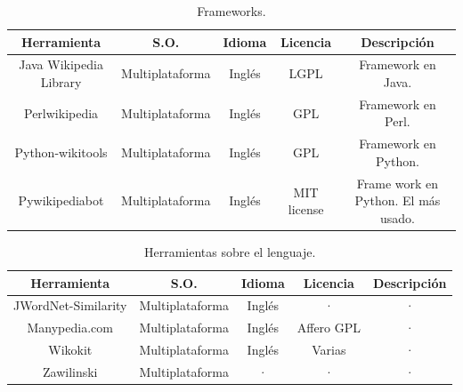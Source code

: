 \documentclass[11pt,onecolumn]{article}
\begin{document}
\begin{table}
\centering
\begin{tabular}{| c | c | c | c | c |}
\hline
\textbf{Herramienta} & \textbf{S.O.} & \textbf{Idioma} & \textbf{Licencia} & \textbf{Descripción} \\
\hline
Java Wikipedia Library & Multiplataforma & Inglés & LGPL & Framework en Java. \\ \hline
Perlwikipedia & Multiplataforma & Inglés & GPL & Framework en Perl. \\ \hline
Python-wikitools & Multiplataforma & Inglés & GPL & Framework en Python. \\ \hline
Pywikipediabot & Multiplataforma & Inglés & MIT license & Frame work en Python. El más usado. \\ \hline
\end{tabular}
\caption{Frameworks.}
\label{tab:frameworkstable}
\end{table}


\begin{table}
\centering
\begin{tabular}{| c | c | c | c | c |}
\hline
\textbf{Herramienta} & \textbf{S.O.} & \textbf{Idioma} & \textbf{Licencia} & \textbf{Descripción} \\
\hline
JWordNet-Similarity & Multiplataforma & Inglés & · & · \\ \hline 
Manypedia.com & Multiplataforma & Inglés & Affero GPL & · \\ \hline 
Wikokit & Multiplataforma & Inglés & Varias & · \\ \hline 
Zawilinski & Multiplataforma & · & · & · \\ \hline 
\end{tabular}
\caption{Herramientas sobre el lenguaje.}
\label{tab:languagetoolstable}
\end{table}
\end{document}
